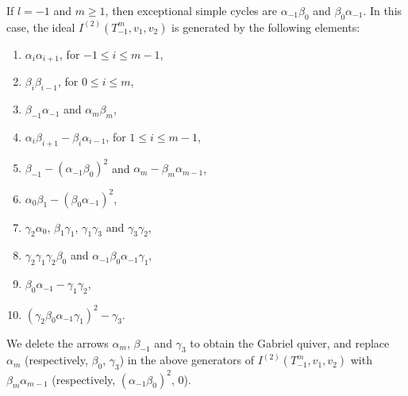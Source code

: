 \documentclass[12pt]{amsart}
\numberwithin{equation}{thm}
\begin{document}
If $l=-1$ and $m\ge1$, then exceptional simple cycles are $\alpha_{-1}\beta_0$ and $\beta_0\alpha_{-1}$. 
In this case, the ideal $I^{(2)}(T_{-1}^{m},v_{1},v_{2})$ is generated by the following elements:
\begin{enumerate}
\item $\alpha_{i}\alpha_{i+1}$, for $-1\leq i\leq m-1$,
\item $\beta_{i}\beta_{i-1}$, for $0\leq i\leq m$,  
\item $\beta_{-1}\alpha_{-1}$ and $\alpha_m\beta_m$,
\item $\alpha_{i}\beta_{i+1}-\beta_{i}\alpha_{i-1}$, for $1\leq i\leq m-1$, 
\item $\beta_{-1}-(\alpha_{-1}\beta_{0})^{2}$ and $\alpha_{m}-\beta_{m}\alpha_{m-1}$,
\item $\alpha_{0}\beta_{1}-(\beta_{0}\alpha_{-1})^{2}$,
\item $\gamma_{2}\alpha_{0}$, $\beta_{1}\gamma_{1}$, $\gamma_{1}\gamma_{3}$ and $\gamma_{3}\gamma_{2}$,
\item $\gamma_2\gamma_1\gamma_2\beta_0$ and $\alpha_{-1}\beta_0\alpha_{-1}\gamma_1$,
\item $\beta_0\alpha_{-1}-\gamma_1\gamma_2$,
\item $(\gamma_2\beta_0\alpha_{-1}\gamma_1)^2-\gamma_3$.
\end{enumerate}
We delete the arrows $\alpha_{m}$, $\beta_{-1}$ and $\gamma_{3}$ to obtain the Gabriel quiver, 
and replace $\alpha_{m}$ (respectively, $\beta_0$, $\gamma_{3}$) in the above generators of 
$I^{(2)}(T_{-1}^{m},v_{1},v_{2})$  with $\beta_{m}\alpha_{m-1}$ 
(respectively, $(\alpha_{-1}\beta_{0})^{2}$, $0$).
\end{document}
